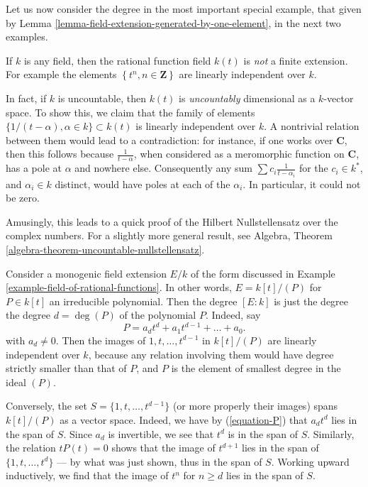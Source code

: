 \noindent
Let us now consider the degree in the most important special example, that
given by Lemma \ref{lemma-field-extension-generated-by-one-element}, in the
next two examples.

\begin{example}
\label{example-degree-rational-function-field}
If $k$ is any field, then the rational function field $k(t)$ is
{\it not} a finite extension. For example the elements
$\left\{t^n, n \in \mathbf{Z}\right\}$ are linearly independent over $k$.

\medskip\noindent
In fact, if $k$ is uncountable, then $k(t)$ is {\it uncountably} dimensional
as a $k$-vector space. To show this, we claim that the family of elements
$\{1/(t- \alpha), \alpha \in k\} \subset k(t)$ is linearly independent over
$k$. A nontrivial relation between them would lead to a contradiction: for
instance, if one works over $\mathbf{C}$, then this follows because
$\frac{1}{t-\alpha}$, when considered as a meromorphic function on
$\mathbf{C}$, has a pole at $\alpha$ and nowhere else.
Consequently any sum $\sum c_i \frac{1}{t - \alpha_i}$ for the $c_i \in k^*$,
and $\alpha_i \in k$ distinct, would have poles at each of the $\alpha_i$.
In particular, it could not be zero.

\medskip\noindent
Amusingly, this leads to a quick proof of the Hilbert Nullstellensatz over
the complex numbers. For a slightly more general result, see
Algebra, Theorem \ref{algebra-theorem-uncountable-nullstellensatz}. 
\end{example}

\begin{example}
\label{example-degree-simple-algebraic-extension}
Consider a monogenic field extension $E/k$ of the form discussed in
Example \ref{example-field-of-rational-functions}.
In other words, $E = k[t]/(P)$ for $P \in k[t]$ an irreducible polynomial.
Then the degree $[E : k]$ is just the degree the degree $d = \deg(P)$ of the
polynomial $P$. Indeed, say
\begin{equation}
\label{equation-P}
P = a_d t^d + a_1 t^{d - 1} + \dots + a_0.
\end{equation}
with $a_d \not = 0$. Then the images of $1, t, \dots, t^{d - 1}$ in
$k[t]/(P)$ are linearly independent over $k$, because any relation involving
them would have degree strictly smaller than that of $P$, and $P$ is the
element of smallest degree in the ideal $(P)$.

\medskip\noindent
Conversely, the set $S = \{1, t, \dots, t^{d - 1}\}$ (or more
properly their images) spans $k[t]/(P)$ as a vector space.
Indeed, we have by (\ref{equation-P}) that $a_d t^d$ lies in the span of $S$.
Since $a_d$ is invertible, we see that $t^d$ is in the span of $S$.
Similarly, the relation $t P(t) = 0$ shows that the image of $t^{d + 1}$
lies in the span of $\{1, t, \dots, t^d\}$ --- by what was just shown, thus
in the span of $S$. Working upward inductively, we find
that the image of $t^n$ for $n \geq d$ lies in the span of $S$.
\end{example}

